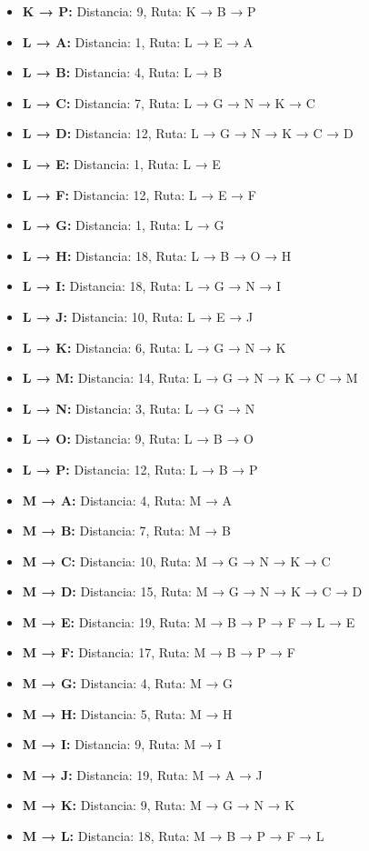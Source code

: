 \documentclass[12pt]{article}
\begin{document}
\begin{itemize}
\item \textbf{K → P:} Distancia: 9, Ruta: K → B → P
\item \textbf{L → A:} Distancia: 1, Ruta: L → E → A
\item \textbf{L → B:} Distancia: 4, Ruta: L → B
\item \textbf{L → C:} Distancia: 7, Ruta: L → G → N → K → C
\item \textbf{L → D:} Distancia: 12, Ruta: L → G → N → K → C → D
\item \textbf{L → E:} Distancia: 1, Ruta: L → E
\item \textbf{L → F:} Distancia: 12, Ruta: L → E → F
\item \textbf{L → G:} Distancia: 1, Ruta: L → G
\item \textbf{L → H:} Distancia: 18, Ruta: L → B → O → H
\item \textbf{L → I:} Distancia: 18, Ruta: L → G → N → I
\item \textbf{L → J:} Distancia: 10, Ruta: L → E → J
\item \textbf{L → K:} Distancia: 6, Ruta: L → G → N → K
\item \textbf{L → M:} Distancia: 14, Ruta: L → G → N → K → C → M
\item \textbf{L → N:} Distancia: 3, Ruta: L → G → N
\item \textbf{L → O:} Distancia: 9, Ruta: L → B → O
\item \textbf{L → P:} Distancia: 12, Ruta: L → B → P
\item \textbf{M → A:} Distancia: 4, Ruta: M → A
\item \textbf{M → B:} Distancia: 7, Ruta: M → B
\item \textbf{M → C:} Distancia: 10, Ruta: M → G → N → K → C
\item \textbf{M → D:} Distancia: 15, Ruta: M → G → N → K → C → D
\item \textbf{M → E:} Distancia: 19, Ruta: M → B → P → F → L → E
\item \textbf{M → F:} Distancia: 17, Ruta: M → B → P → F
\item \textbf{M → G:} Distancia: 4, Ruta: M → G
\item \textbf{M → H:} Distancia: 5, Ruta: M → H
\item \textbf{M → I:} Distancia: 9, Ruta: M → I
\item \textbf{M → J:} Distancia: 19, Ruta: M → A → J
\item \textbf{M → K:} Distancia: 9, Ruta: M → G → N → K
\item \textbf{M → L:} Distancia: 18, Ruta: M → B → P → F → L

\end{itemize}
\end{document}
